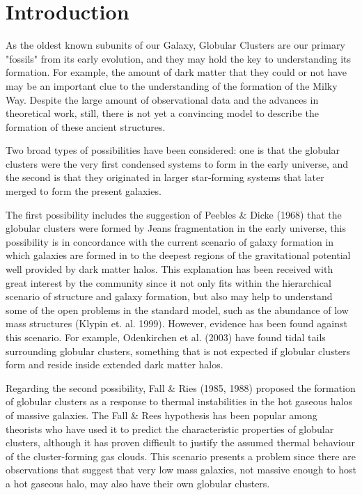 \chapter{Introduction}

As the oldest known subunits of our Galaxy, Globular Clusters are our primary "fossils" from its early evolution, and they may hold the key to understanding its formation. For example, the amount of dark matter that they could or not have may be an important clue to the understanding of the formation of the Milky Way. Despite the large amount of observational data and the advances in theoretical work, still, there is not yet a convincing model to describe the formation of these ancient structures. 

Two broad types of possibilities have been considered: one is that the globular clusters were the very first condensed systems to form in the early universe, and the second is that they originated in larger star-forming systems that later merged to form the present galaxies. 

The first possibility includes the suggestion of Peebles \& Dicke (1968) that the globular clusters were formed by Jeans fragmentation in the early universe, this possibility is in concordance with the current scenario of galaxy formation in which galaxies are formed in to the deepest regions of the gravitational potential well provided by dark matter halos. This explanation has been received with great interest by the community since it not only fits within the hierarchical scenario of structure and galaxy formation, but also may help to understand some of the open problems in the standard model, such as the abundance of low mass structures (Klypin et. al. 1999). However, evidence has been found against this scenario. For example, Odenkirchen et al. (2003) have found tidal tails surrounding globular clusters, something that is not expected if globular clusters form and reside inside extended dark matter halos.

Regarding the second possibility, Fall \& Ries (1985, 1988) proposed the formation of globular clusters as a response to thermal instabilities in the hot gaseous halos of massive galaxies. The Fall \& Rees hypothesis has been popular among theorists who have used it to predict the characteristic properties of globular clusters, although it has proven difficult to justify the assumed thermal behaviour of the cluster-forming gas clouds. This scenario presents a problem since there are observations that suggest that very low mass galaxies, not massive enough to host a hot gaseous halo, may also have their own globular clusters.

